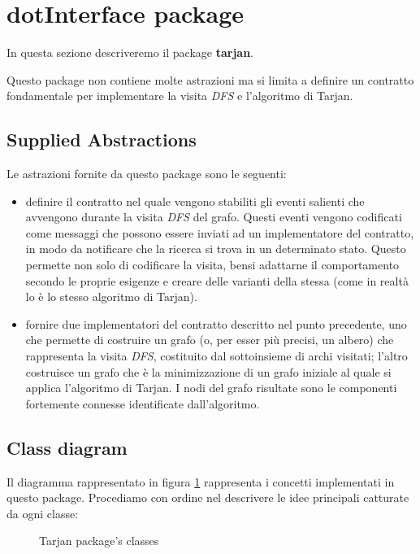 \section{dotInterface package}

In questa sezione descriveremo il package \textbf{tarjan}.

Questo package non contiene molte astrazioni ma si limita a definire
un contratto fondamentale per implementare la visita \emph{DFS} e
l'algoritmo di Tarjan.

\subsection{Supplied Abstractions}

Le astrazioni fornite da questo package sono le seguenti:
\begin{itemize}
\item definire il contratto nel quale vengono stabiliti gli eventi
  salienti che avvengono durante la visita \emph{DFS} del
  grafo. Questi eventi vengono codificati come messaggi che possono
  essere inviati ad un implementatore del contratto, in modo da
  notificare che la ricerca si trova in un determinato stato. Questo
  permette non solo di codificare la visita, bensi adattarne il
  comportamento secondo le proprie esigenze e creare delle varianti
  della stessa (come in realt\`a lo \`e lo stesso algoritmo di
  Tarjan).
\item fornire due implementatori del contratto descritto nel punto
  precedente, uno che permette di costruire un grafo (o, per esser
  pi\`u precisi, un albero) che rappresenta la visita \emph{DFS},
  costituito dal sottoinsieme di archi visitati; l'altro costruisce un
  grafo che \`e la minimizzazione di un grafo iniziale al quale si
  applica l'algoritmo di Tarjan. I nodi del grafo risultate sono le
  componenti fortemente connesse identificate dall'algoritmo.
\end{itemize}

\subsection{Class diagram}
Il diagramma rappresentato in figura \ref{fig:tarjan-package-classes}
rappresenta i concetti implementati in questo package. Procediamo con
ordine nel descrivere le idee principali catturate da ogni classe:

\begin{figure}
  \centering
  \caption{Tarjan package's classes}
  \label{fig:tarjan-package-classes}
\end{figure}

